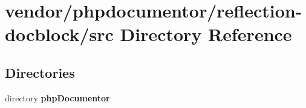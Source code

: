 \section{vendor/phpdocumentor/reflection-\/docblock/src Directory Reference}
\label{dir_e27012d2893cd0ee77ffdfb6b044b323}
\subsection*{Directories}
\begin{DoxyCompactItemize}
\item 
directory {\bf php\+Documentor}
\end{DoxyCompactItemize}
